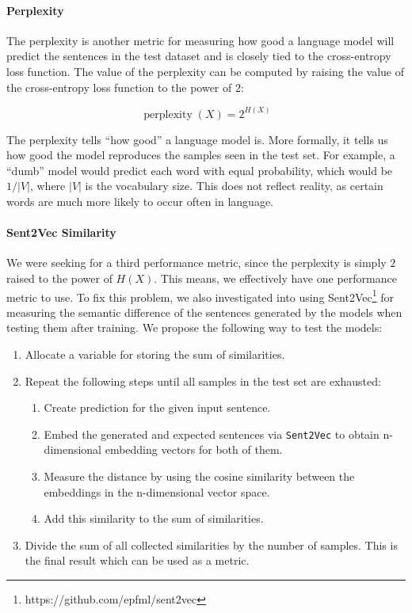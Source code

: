 \paragraph{Perplexity} The perplexity is another metric for measuring how good a language model will predict the sentences in the test dataset and is closely tied to the cross-entropy loss function. The value of the perplexity can be computed by raising the value of the cross-entropy loss function to the power of $2$:

\begin{equation}
\operatorname{perplexity}(X) = 2^{H(X)}
\end{equation}

The perplexity tells ``how good'' a language model is. More formally, it tells us how good the model reproduces the samples seen in the test set. For example, a ``dumb'' model would predict each word with equal probability, which would be $1/|V|$, where $|V|$ is the vocabulary size. This does not reflect reality, as certain words are much more likely to occur often in language.

\paragraph{Sent2Vec Similarity}\label{fundamentals:sent2vec_test} We were seeking for a third performance metric, since the perplexity is simply $2$ raised to the power of $H(X)$. This means, we effectively have one performance metric to use. To fix this problem, we also investigated into using Sent2Vec\footnote{https://github.com/epfml/sent2vec} \cite{Pgj:2017} for measuring the semantic difference of the sentences generated by the models when testing them after training. We propose the following way to test the models:

\begin{enumerate}[noitemsep]
	\item Allocate a variable for storing the sum of similarities.
	\item Repeat the following steps until all samples in the test set are exhausted:
	\begin{enumerate}[noitemsep]
		\item Create prediction for the given input sentence.
		\item Embed the generated and expected sentences via \texttt{Sent2Vec} to obtain n-dimensional embedding vectors for both of them.
		\item Measure the distance by using the cosine similarity between the embeddings in the n-dimensional vector space.
		\item Add this similarity to the sum of similarities.
	\end{enumerate}
	\item Divide the sum of all collected similarities by the number of samples. This is the final result which can be used as a metric.
\end{enumerate}

